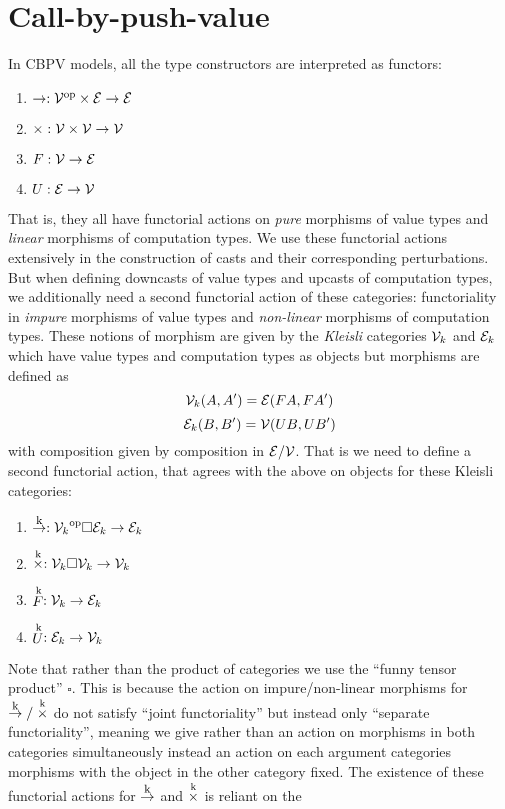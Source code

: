\section{Call-by-push-value}

In CBPV models, all the type constructors are interpreted as functors:
\begin{enumerate}
\item $\to : {\mathcal{V}}^{\textrm{op}} \times \mathcal{E} \to \mathcal{E}$
\item $\times : \mathcal{V} \times \mathcal{V} \to \mathcal{V}$
\item $F : \mathcal{V} \to \mathcal{E}$
\item $U : \mathcal{E} \to \mathcal{V}$
\end{enumerate}
That is, they all have functorial actions on \emph{pure} morphisms of
value types and \emph{linear} morphisms of computation types.
%
We use these functorial actions extensively in the construction of
casts and their corresponding perturbations. But when defining
downcasts of value types and upcasts of computation types, we
additionally need a second functorial action of these categories:
functoriality in \emph{impure} morphisms of value types and
\emph{non-linear} morphisms of computation types. These notions of
morphism are given by the \emph{Kleisli} categories $\mathcal{V}_k$ and
$\mathcal{E}_k$ which have value types and computation types as objects but
morphisms are defined as
\[ \mathcal{V}_k(A,A') = \mathcal{E}(F A, FA')\]
\[ \mathcal{E}_k(B,B') = \mathcal{V}(U B, U B')\]
with composition given by composition in $\mathcal{E}/\mathcal{V}$.  That is we
need to define a second functorial action, that agrees with the above
on objects for these Kleisli categories:
\begin{enumerate}
\item $\mathrel{\mathop{\to}\limits^{\textrm{\footnotesize k}}} : {\mathcal{V}_k}^{\textrm{op}} \square \mathcal{E}_k \to \mathcal{E}_k$
\item $\mathrel{\mathop{\times}\limits^{\textrm{k}}} : \mathcal{V}_k \square \mathcal{V}_k \to \mathcal{V}_k$
\item $\mathrel{\mathop{F}\limits^{\textrm{k}}} : \mathcal{V}_k \to \mathcal{E}_k$
\item $\mathrel{\mathop{U}\limits^{\textrm{k}}} : \mathcal{E}_k \to \mathcal{V}_k$
\end{enumerate}
Note that rather than the product of categories we use the ``funny
tensor product'' $\square$. This is because the action on
impure/non-linear morphisms for $\mathrel{\mathop{\to}\limits^{\textrm{\footnotesize k}}}/\mathrel{\mathop{\times}\limits^{\textrm{k}}}$ do not satisfy ``joint
functoriality'' but instead only ``separate functoriality'', meaning
we give rather than an action on morphisms in both categories
simultaneously instead an action on each argument categories morphisms
with the object in the other category fixed. The existence of these
functorial actions for $\mathrel{\mathop{\to}\limits^{\textrm{\footnotesize k}}}$ and $\mathrel{\mathop{\times}\limits^{\textrm{k}}}$ is reliant on the
